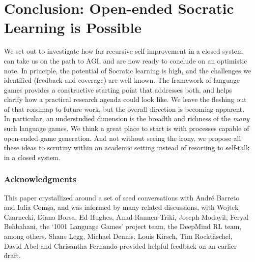 \documentclass[dvipsnames]{article} %
\begin{document}
\section{Conclusion: Open-ended Socratic Learning is Possible}

We set out to investigate how far recursive self-improvement in a closed system can take us on the path to AGI, and are now ready to conclude on an optimistic note.
In principle, the potential of Socratic learning is high, and the challenges we identified (feedback and coverage) are well known. The framework of language games provides a constructive starting point that addresses both, and helps clarify how a practical research agenda could look like. We leave the fleshing out of that roadmap to future work, but the overall direction is becoming apparent.
In particular, an understudied dimension is the breadth and richness of the \emph{many} such language games. We think a great place to start is with processes capable of open-ended game generation.
And not without seeing the irony, we propose all these ideas to scrutiny within an academic setting instead of resorting to self-talk in a closed system. 

\subsubsection*{Acknowledgments} This paper crystallized around a set of seed conversations with Andr\'{e} Barreto and Iulia Com\c{s}a, and was informed by many related discussions, with Wojtek Czarnecki, Diana Borsa, Ed Hughes, Amal Rannen-Triki, Joseph Modayil, Feryal Behbahani, the `1001 Language Games' project team, the DeepMind RL team, among others. Shane Legg, Michael Dennis, Louis Kirsch, Tim Rockt\"{a}schel, David Abel and Chrisantha Fernando provided helpful feedback on an earlier draft.





\end{document}
